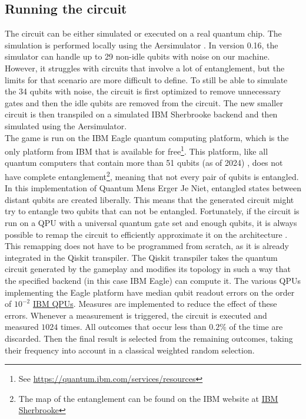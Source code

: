 \documentclass[final,5p,times,twocolumn,authoryear]{elsarticle}
\begin{document}
\subsection{Running the circuit}\label{sec:run_circuit}
The circuit can be either simulated or executed on a real quantum chip. The simulation is performed locally using the Aersimulator \cite{qiskitAer2024}. In version 0.16, the simulator can handle up to 29 non-idle qubits with noise on our machine. However, it struggles with circuits that involve a lot of entanglement, but the limits for that scenario are more difficult to define.
To still be able to simulate the 34 qubits with noise, the circuit is first optimized to remove unnecessary gates and then the idle qubits are removed from the circuit. The new smaller circuit is then transpiled on a simulated IBM Sherbrooke backend and then simulated using the Aersimulator.\\
The game is run on the IBM Eagle quantum computing platform, which is the only platform from IBM that is available for free\footnote{See \url{https://quantum.ibm.com/services/resources}}. This platform, like all quantum computers that contain more than 51 qubits (as of 2024) \cite{cao2023generation}, does not have complete entanglement\footnote{The map of the entanglement can be found on the IBM website at \href{https://quantum.ibm.com/services/resources?system=ibm_sherbrooke}{IBM Sherbrooke}}, meaning that not every pair of qubits is entangled. In this implementation of Quantum Mens Erger Je Niet, entangled states between distant qubits are created liberally. This means that the generated circuit might try to entangle two qubits that can not be entangled. Fortunately, if the circuit is run on a QPU with a universal quantum gate set and enough qubits, it is always possible to remap the circuit to efficiently approximate it on the architecture \cite{kitaev1997quantum}. This remapping does not have to be programmed from scratch, as it is already integrated in the Qiskit transpiler. The Qiskit transpiler takes the quantum circuit generated by the gameplay and modifies its topology in such a way that the specified backend (in this case IBM Eagle) can compute it. The various QPUs implementing the Eagle platform have median qubit readout errors on the order of $10^{-2}$ \href{https://quantum.ibm.com/services/resources}{IBM QPUs}. Measures are implemented to reduce the effect of these errors. Whenever a measurement is triggered, the circuit is executed and measured $1024$ times. All outcomes that occur less than $0.2\%$ of the time are discarded. Then the final result is selected from the remaining outcomes, taking their frequency into account in a classical weighted random selection.
\end{document}
